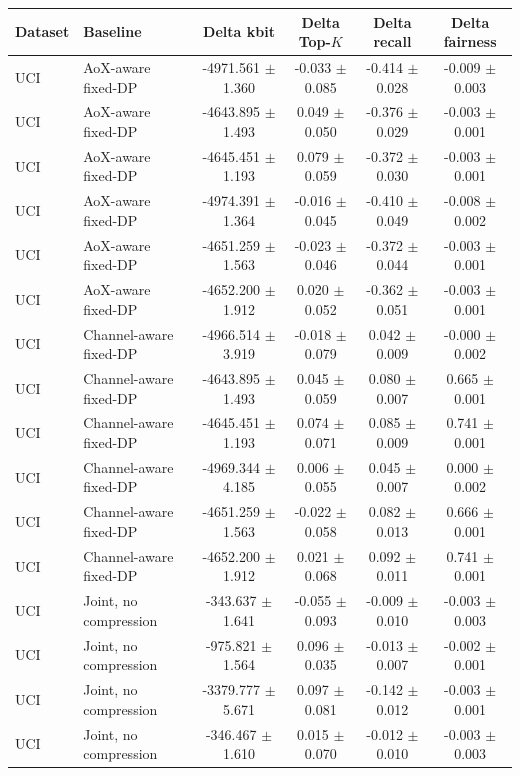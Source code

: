 \begin{tabular}{llcccc}
\toprule
Dataset & Baseline & Delta kbit & Delta Top-$K$ & Delta recall & Delta fairness \\
\midrule
UCI & AoX-aware fixed-DP & -4971.561 $\pm$ 1.360 & -0.033 $\pm$ 0.085 & -0.414 $\pm$ 0.028 & -0.009 $\pm$ 0.003 \\
UCI & AoX-aware fixed-DP & -4643.895 $\pm$ 1.493 & 0.049 $\pm$ 0.050 & -0.376 $\pm$ 0.029 & -0.003 $\pm$ 0.001 \\
UCI & AoX-aware fixed-DP & -4645.451 $\pm$ 1.193 & 0.079 $\pm$ 0.059 & -0.372 $\pm$ 0.030 & -0.003 $\pm$ 0.001 \\
UCI & AoX-aware fixed-DP & -4974.391 $\pm$ 1.364 & -0.016 $\pm$ 0.045 & -0.410 $\pm$ 0.049 & -0.008 $\pm$ 0.002 \\
UCI & AoX-aware fixed-DP & -4651.259 $\pm$ 1.563 & -0.023 $\pm$ 0.046 & -0.372 $\pm$ 0.044 & -0.003 $\pm$ 0.001 \\
UCI & AoX-aware fixed-DP & -4652.200 $\pm$ 1.912 & 0.020 $\pm$ 0.052 & -0.362 $\pm$ 0.051 & -0.003 $\pm$ 0.001 \\
UCI & Channel-aware fixed-DP & -4966.514 $\pm$ 3.919 & -0.018 $\pm$ 0.079 & 0.042 $\pm$ 0.009 & -0.000 $\pm$ 0.002 \\
UCI & Channel-aware fixed-DP & -4643.895 $\pm$ 1.493 & 0.045 $\pm$ 0.059 & 0.080 $\pm$ 0.007 & 0.665 $\pm$ 0.001 \\
UCI & Channel-aware fixed-DP & -4645.451 $\pm$ 1.193 & 0.074 $\pm$ 0.071 & 0.085 $\pm$ 0.009 & 0.741 $\pm$ 0.001 \\
UCI & Channel-aware fixed-DP & -4969.344 $\pm$ 4.185 & 0.006 $\pm$ 0.055 & 0.045 $\pm$ 0.007 & 0.000 $\pm$ 0.002 \\
UCI & Channel-aware fixed-DP & -4651.259 $\pm$ 1.563 & -0.022 $\pm$ 0.058 & 0.082 $\pm$ 0.013 & 0.666 $\pm$ 0.001 \\
UCI & Channel-aware fixed-DP & -4652.200 $\pm$ 1.912 & 0.021 $\pm$ 0.068 & 0.092 $\pm$ 0.011 & 0.741 $\pm$ 0.001 \\
UCI & Joint, no compression & -343.637 $\pm$ 1.641 & -0.055 $\pm$ 0.093 & -0.009 $\pm$ 0.010 & -0.003 $\pm$ 0.003 \\
UCI & Joint, no compression & -975.821 $\pm$ 1.564 & 0.096 $\pm$ 0.035 & -0.013 $\pm$ 0.007 & -0.002 $\pm$ 0.001 \\
UCI & Joint, no compression & -3379.777 $\pm$ 5.671 & 0.097 $\pm$ 0.081 & -0.142 $\pm$ 0.012 & -0.003 $\pm$ 0.001 \\
UCI & Joint, no compression & -346.467 $\pm$ 1.610 & 0.015 $\pm$ 0.070 & -0.012 $\pm$ 0.010 & -0.003 $\pm$ 0.003 \\

\end{tabular}
